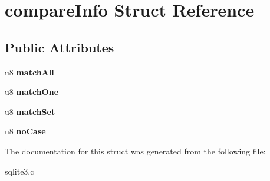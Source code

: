 \hypertarget{structcompareInfo}{}\section{compare\+Info Struct Reference}
\label{structcompareInfo}
\subsection*{Public Attributes}
\begin{DoxyCompactItemize}
\item 
u8 {\bfseries match\+All}\hypertarget{structcompareInfo_a1161e850029ef556e6daee856d32b2e2}{}\label{structcompareInfo_a1161e850029ef556e6daee856d32b2e2}

\item 
u8 {\bfseries match\+One}\hypertarget{structcompareInfo_ab9aabbf6d3df26bad786b532330a2fd7}{}\label{structcompareInfo_ab9aabbf6d3df26bad786b532330a2fd7}

\item 
u8 {\bfseries match\+Set}\hypertarget{structcompareInfo_a5d2ff58a72c9eb7d22f18915c1751655}{}\label{structcompareInfo_a5d2ff58a72c9eb7d22f18915c1751655}

\item 
u8 {\bfseries no\+Case}\hypertarget{structcompareInfo_a6de76861b066547321f7a255cb7042ab}{}\label{structcompareInfo_a6de76861b066547321f7a255cb7042ab}

\end{DoxyCompactItemize}


The documentation for this struct was generated from the following file\+:\begin{DoxyCompactItemize}
\item 
sqlite3.\+c\end{DoxyCompactItemize}
